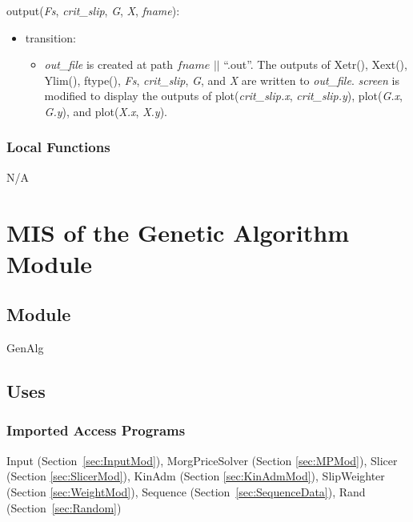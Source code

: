 \documentclass[12pt, titlepage]{article}
\begin{document}
\noindent output(\textit{Fs}, \textit{crit\_slip}, \textit{G}, \textit{X}, 
\textit{fname}):
\begin{itemize}
	\item transition:
	\begin{itemize}
		\item[] \textit{out\_file} is created at path $\textit{fname}$ $||$ 
		``.out''. The outputs of Xetr(), Xext(), Ylim(), ftype(), \textit{Fs}, 
		\textit{crit\_slip}, \textit{G}, and \textit{X} are written to 
		\textit{out\_file}.
		\textit{screen} is modified to display the outputs of 
		plot(\textit{crit\_slip.x}, \textit{crit\_slip.y}), plot(\textit{G.x}, 
		\textit{G.y}), and plot(\textit{X.x}, \textit{X.y}).  \\
	\end{itemize}
\end{itemize}

\subsubsection{Local Functions}
N/A


\section{MIS of the Genetic Algorithm Module} \label{sec:GenAlgMod}

\subsection{Module}
GenAlg

\subsection{Uses}

\subsubsection{Imported Access Programs}
Input (Section~\ref{sec:InputMod}), MorgPriceSolver (Section \ref{sec:MPMod}), 
Slicer (Section \ref{sec:SlicerMod}), KinAdm (Section \ref{sec:KinAdmMod}), 
SlipWeighter (Section \ref{sec:WeightMod}), Sequence 
(Section~\ref{sec:SequenceData}), Rand (Section~\ref{sec:Random})
\end{document}
